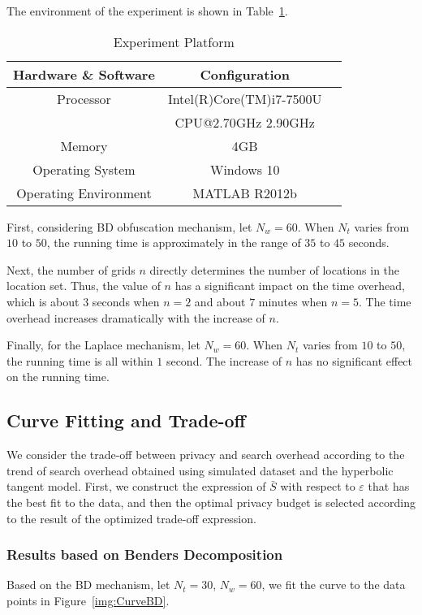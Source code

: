 The environment of the experiment is shown in Table~\ref{tab:envi}.
\begin{table}
  \caption{Experiment Platform}
  \label{tab:envi}
  \begin{tabular}{ccl}
    \toprule
    Hardware \& Software & Configuration\\
    \midrule
    Processor & Intel(R)Core(TM)i7-7500U \\
              & CPU@2.70GHz 2.90GHz\\
    Memory & 4GB\\
    Operating System & Windows 10\\
    Operating Environment & MATLAB R2012b\\
  \bottomrule
\end{tabular}
\end{table}

First, considering BD obfuscation mechanism, let $N_w=60$. When $N_t$ varies from $10$ to $50$, the running time is approximately in the range of $35$ to $45$ seconds.

Next, the number of grids $n$ directly determines the number of locations in the location set. Thus, the value of $n$ has a significant impact on the time overhead, which is about $3$ seconds when $n=2$ and about $7$ minutes when $n=5$. The time overhead increases dramatically with the increase of $n$.

Finally, for the Laplace mechanism, let $N_w=60$. When $N_t$ varies from $10$ to $50$, the running time is all within $1$ second. The increase of $n$ has no significant effect on the running time.

\subsection{Curve Fitting and Trade-off} %
We consider the trade-off between privacy and search overhead according to the trend of search overhead obtained using simulated dataset and the hyperbolic tangent model. First, we construct the expression of $\bar{S}$ with respect to $\varepsilon$ that has the best fit to the data, and then the optimal privacy budget is selected according to the result of the optimized trade-off expression.

\subsubsection{Results based on Benders Decomposition}
Based on the BD mechanism, let $N_t=30$, $N_w=60$, we fit the curve to the data points in Figure~\ref{img:CurveBD}.


